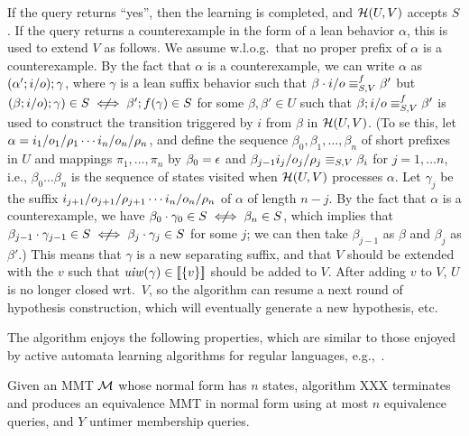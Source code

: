 If the query returns ``yes'', then
the learning is completed, and $\mathcal{H}(U,V)$ accepts $S$.
If the query returns a counterexample in the form of a lean behavior
$\alpha$, this is used to extend $V$ as follows.
We assume w.l.o.g.\ that no proper prefix of $\alpha$ is a counterexample. 
By the fact that $\alpha$ is a counterexample, we can write $\alpha$ as
$(\alpha';i/o); \gamma$, where $\gamma$ is a lean suffix
behavior such that
$\beta\cdot i/o \equiv_{S,V}^f \beta'$ but
$(\beta ; \simpleutlabel{i}{o}) ; \gamma) \in S \notiff \beta' ; f(\gamma) \in S$ for some $\beta,\beta' \in U$ such that 
$\beta;i/o \equiv_{S,V}^f \beta'$ is used to construct
the transition triggered by $i$ from $\beta$ in $\mathcal{H}(U,V)$.
(To se this, let $\alpha = i_1/o_1/\rho_1 \cdots i_n/o_n/\rho_n$, and
define the sequence $\beta_0, \beta_1, \ldots ,\beta_{n}$ of short prefixes
in $U$ and mappings $\pi_1, \ldots , \pi_n$ by $\beta_0 = \epsilon$ and
$\beta_{j-1}i_j/o_j/\rho_j \equiv_{S,V} \beta_{i}$ for
$j = 1, \ldots n$, i.e., $\beta_0 \ldots \beta_n$ is the sequence of states
visited when $\mathcal{H}(U,V)$ processes $\alpha$. Let $\gamma_j$ be the suffix
$i_{j+1}/o_{j+1}/\rho_{j+1} \cdots i_n/o_n/\rho_n$
of $\alpha$ of length $n-j$. 
By the fact that $\alpha$ is a counterexample, we have
$\beta_0\cdot\gamma_0 \in S \notiff  \beta_{n} \in S$, which implies that
$\beta_{j-1}\cdot\gamma_{j-1} \in S \notiff \beta_j\cdot\gamma_j \in S$
for some $j$;
we can then take $\beta_{j-1}$ as $\beta$ and $\beta_j$ as $\beta'$.)
This means that $\gamma$ is a new separating suffix, and that $V$ should be
extended with the $v$ such that
$\mathit{uiw}(\gamma) \in [\![ \lbrace v\rbrace ] \! ]$
should be added to
$V$. After adding $v$ to $V$, $U$ is no longer closed
wrt.\ $V$, so the algorithm can resume a next round of
hypothesis construction, which will eventually generate a new hypothesis,
etc.


The algorithm enjoys the following properties, which are similar to those
enjoyed by active automata learning algorithms for regular languages,
e.g.,~\cite{Ang87}.

\begin{theorem}
  \label{thm:alg:termination}
Given an MMT ${\mathcal M}$ whose normal form has $n$ states, 
algorithm XXX terminates and produces an equivalence MMT in normal form
using at most $n$ equivalence queries, and
$Y$ untimer membership queries.
\end{theorem}
   
